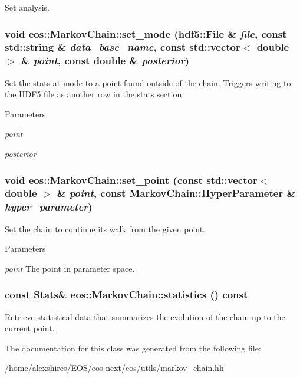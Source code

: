 Set analysis. \hypertarget{classeos_1_1MarkovChain_a24a9d7e2f6f930594dd7140acd6180bb}{
\subsubsection[{set\_\-mode}]{\setlength{\rightskip}{0pt plus 5cm}void eos::MarkovChain::set\_\-mode ({\bf hdf5::File} \& {\em file}, \/  const std::string \& {\em data\_\-base\_\-name}, \/  const std::vector$<$ double $>$ \& {\em point}, \/  const double \& {\em posterior})}}
\label{classeos_1_1MarkovChain_a24a9d7e2f6f930594dd7140acd6180bb}
Set the stats at mode to a point found outside of the chain. Triggers writing to the HDF5 file as another row in the stats section.


\begin{DoxyParams}{Parameters}
\item[{\em point}]\item[{\em posterior}]\end{DoxyParams}
\hypertarget{classeos_1_1MarkovChain_a84d4342221f7f6a826d0a9a2480165c4}{
\subsubsection[{set\_\-point}]{\setlength{\rightskip}{0pt plus 5cm}void eos::MarkovChain::set\_\-point (const std::vector$<$ double $>$ \& {\em point}, \/  const {\bf MarkovChain::HyperParameter} \& {\em hyper\_\-parameter})}}
\label{classeos_1_1MarkovChain_a84d4342221f7f6a826d0a9a2480165c4}
Set the chain to continue its walk from the given point.


\begin{DoxyParams}{Parameters}
\item[{\em point}]The point in parameter space. \end{DoxyParams}
\hypertarget{classeos_1_1MarkovChain_af48c29cabc958e061f699e595ffa3294}{
\subsubsection[{statistics}]{\setlength{\rightskip}{0pt plus 5cm}const {\bf Stats}\& eos::MarkovChain::statistics () const}}
\label{classeos_1_1MarkovChain_af48c29cabc958e061f699e595ffa3294}


Retrieve statistical data that summarizes the evolution of the chain up to the current point. 

The documentation for this class was generated from the following file:\begin{DoxyCompactItemize}
\item 
/home/alexshires/EOS/eos-\/next/eos/utils/\hyperlink{markov__chain_8hh}{markov\_\-chain.hh}\end{DoxyCompactItemize}
